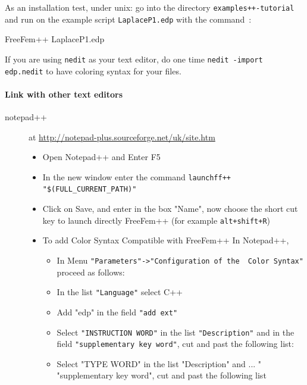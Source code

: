 \documentclass[a4paper,twoside,12pt]{book}
\begin{document}
As an installation test, under unix:  go into the directory
\texttt{examples++-tutorial} and run \freefempp on the example script
\texttt{LaplaceP1.edp} with the command~:

\bFF
FreeFem++ LaplaceP1.edp
\eFF

If you are using \texttt{nedit} as your text editor,
do one time \verb!nedit -import edp.nedit! to have coloring syntax for your 
files.


\paragraph{Link with other text editors}
\begin{description}
\item[{notepad++}] at \url{http://notepad-plus.sourceforge.net/uk/site.htm}


\begin{itemize}

\item  Open Notepad++ and Enter  F5
\item   In the new window  enter  the command
\verb!launchff++ "$(FULL_CURRENT_PATH)"!
\item Click on  Save,  and enter  \freefempp in the box  "Name", now  choose
the  short cut key  to launch directly FreeFem++  (for example \texttt{alt+shift+R})
 \item To add    Color Syntax Compatible with FreeFem++ In Notepad++,
 \begin{itemize}
\item In  Menu \verb!"Parameters"->"Configuration of the  Color Syntax"! proceed as follows:
\item In the list \verb!"Language"! select C++
\item Add "edp" in the  field  \verb!"add ext"!
\item Select  \verb!"INSTRUCTION WORD"! in the  list \verb!"Description"! and in the field
\verb!"supplementary key word"!, cut and past the following list:


\item Select "TYPE WORD" in the list "Description" and ... " "supplementary key word",
cut and past the following list


\end{itemize}
\end{itemize}
\end{description}
\end{document}
